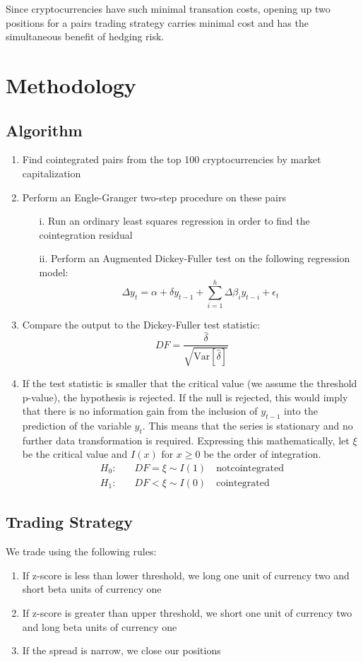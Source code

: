 \documentclass[12pt, letterpaper]{article}
\begin{document}
Since cryptocurrencies have such minimal transation costs, opening up two positions for a pairs trading strategy carries minimal cost and has the simultaneous benefit of hedging risk.

\section{Methodology}
	\subsection{Algorithm}
	\begin{enumerate}
		\item Find cointegrated pairs from the top 100 cryptocurrencies by market capitalization
		\item Perform an Engle-Granger two-step procedure on these pairs \begin{enumerate}
				\item[i.] Run an ordinary least squares regression in order to find the cointegration residual
				\item[ii.] Perform an Augmented Dickey-Fuller test on the following regression model: 
					\begin{equation*}
						\Delta y_t= \alpha + \delta y_{t-1}+\sum_{i=1}^{h}\Delta\beta_i y_{t-i}+\epsilon_t
					\end{equation*}
			\end{enumerate}
		\item Compare the output to the Dickey-Fuller test statistic: $$DF=\frac{\hat{\delta}}{\sqrt{\mathrm{Var}\left[\hat{\delta}\right]}}$$
		\item If the test statistic is smaller that the critical value (we assume the threshold p-value), the hypothesis is rejected. If the null is rejected, this would imply that there is no information gain from the inclusion of $y_{t-1}$ into the prediction of the variable $y_t$. This means that the series is stationary and no further data transformation is required. Expressing this mathematically, let $\xi$ be the critical value and $I(x)$ for $x\geq0$ be the order of integration.
			\begin{align*}
				H_0:& \quad DF=\xi\sim I(1) \quad\mathrm{not cointegrated} \\
				H_1:& \quad DF<\xi\sim I(0) \quad\mathrm{cointegrated}
			\end{align*}
	\end{enumerate}
	\subsection{Trading Strategy}
	We trade using the following rules:
	\begin{enumerate}
		\item If z-score is less than lower threshold, we long one unit of currency two and short beta units of currency one
		\item If z-score is greater than upper threshold, we short one unit of currency two and long beta units of currency one
		\item If the spread is narrow, we close our positions
	\end{enumerate}
\end{document}
